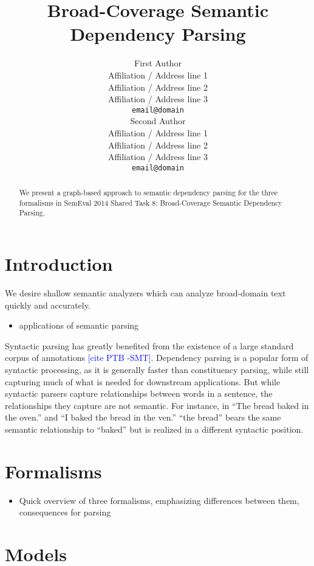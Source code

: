 \documentclass[11pt]{article}
\title{Broad-Coverage Semantic Dependency Parsing}
\author{First Author \\
  Affiliation / Address line 1 \\
  Affiliation / Address line 2 \\
  Affiliation / Address line 3 \\
  {\tt email@domain} \\\And
  Second Author \\
  Affiliation / Address line 1 \\
  Affiliation / Address line 2 \\
  Affiliation / Address line 3 \\
  {\tt email@domain} \\}
\date{}
\newcommand{\sam}[1]{\textcolor{blue}{[#1 -SMT]}}
\begin{document}
\maketitle

\begin{abstract}
We present a graph-based approach to semantic dependency parsing for the
three formalisms in SemEval 2014 Shared Task 8: Broad-Coverage Semantic
Dependency Parsing.
  
\end{abstract}



\section{Introduction}

We desire shallow semantic analyzers which can analyze broad-domain text quickly
and accurately.
\begin{itemize}
\item applications of semantic parsing
\end{itemize}

Syntactic parsing has greatly benefited from the existence of a large standard
corpus of annotations \sam{cite PTB}.
Dependency parsing is a popular form of syntactic processing, as it
is generally faster than constituency parsing, while still capturing much of
what is needed for downstream applications.
But while syntactic parsers capture relationships between words in a sentence,
the relationships they capture are not semantic.
For instance, in ``The bread baked in the oven.'' and ``I baked the bread in the
ven.'' ``the bread'' bears the same semantic relationship to ``baked'' but is
realized in a different syntactic position.

\section{Formalisms}

\begin{itemize}
\item Quick overview of three formalisms, emphasizing differences between them, consequences for parsing
\end{itemize}


\section{Models}
\end{document}
